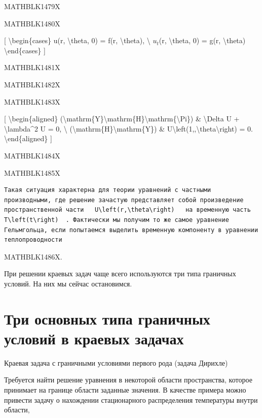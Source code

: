 \documentclass[
]{article}
\begin{document}
{{{MATHBLK1479X

MATHBLK1480X

{[} \textbackslash begin\{cases\} u(r, \textbackslash theta, 0) = f(r,
\textbackslash theta), \textbackslash{} \(u_t\)(r, \textbackslash theta,
0) = g(r, \textbackslash theta) \textbackslash end\{cases\} {]}

MATHBLK1481X

MATHBLK1482X

MATHBLK1483X

{[} \textbackslash begin\{aligned\}
(\textbackslash mathrm\{Y\}\textbackslash mathrm\{H\}\textbackslash mathrm\{\textbackslash Pi\})
\& \textbackslash Delta U + \textbackslash lambda\^{}2 U = 0,
\textbackslash{} (\textbackslash mathrm\{H\}\textbackslash mathrm\{Y\})
\& U\textbackslash left(1,,\textbackslash theta\textbackslash right) =
0. \textbackslash end\{aligned\} {]}

MATHBLK1484X

MATHBLK1485X

\begin{verbatim}
Такая ситуация характерна для теории уравнений с частными производными, где решение зачастую представляет собой произведение пространственной части   U\left(r,\theta\right)   на временную часть   T\left(t\right)  . Фактически мы получим то же самое уравнение Гельмгольца, если попытаемся выделить временную компоненту в уравнении теплопроводности
\end{verbatim}

MATHBLK1486X.

При решении краевых задач чаще всего используются три типа граничных
условий. На них мы сейчас остановимся.

\section{Три основных типа граничных условий в краевых
задачах}\label{ux442ux440ux438-ux43eux441ux43dux43eux432ux43dux44bux445-ux442ux438ux43fux430-ux433ux440ux430ux43dux438ux447ux43dux44bux445-ux443ux441ux43bux43eux432ux438ux439-ux432-ux43aux440ux430ux435ux432ux44bux445-ux437ux430ux434ux430ux447ux430ux445}

Краевая задача с граничными условиями первого рода (задача Дирихле)

Требуется найти решение уравнения в некоторой области пространства,
которое принимает на границе области заданные значения. В качестве
примера можно привести задачу о нахождении стационарного распределения
температуры внутри области,

}}}
\end{document}

